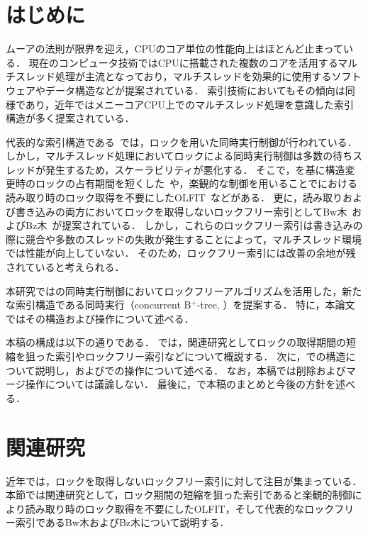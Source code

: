 
\section{はじめに}

ムーアの法則が限界を迎え，CPUのコア単位の性能向上はほとんど止まっている．
現在のコンピュータ技術ではCPUに搭載された複数のコアを活用するマルチスレッド処理が主流となっており，マルチスレッドを効果的に使用するソフトウェアやデータ構造などが提案されている．
索引技術においてもその傾向は同様であり，近年ではメニーコアCPU上でのマルチスレッド処理を意識した索引構造が多く提案されている．

代表的な索引構造である\Bptree{}~\cite{book:dbsystem}では，ロックを用いた同時実行制御が行われている．
しかし，マルチスレッド処理においてロックによる同時実行制御は多数の待ちスレッドが発生するため，スケーラビリティが悪化する．
そこで，\Bptree{}を基に構造変更時のロックの占有期間を短くした\Blinktree{}~\cite{tods1981:Lehman}や，楽観的な制御を用いることで\Blinktree{}における読み取り時のロック取得を不要にしたOLFIT~\cite{vldb2001:Cha}などがある．
更に，読み取りおよび書き込みの両方においてロックを取得しないロックフリー索引としてBw木~\cite{book:Bwtree}およびBz木~\cite{book:Bztree}が提案されている．
しかし，これらのロックフリー索引は書き込みの際に競合や多数のスレッドの失敗が発生することによって，マルチスレッド環境では性能が向上していない．
そのため，ロックフリー索引には改善の余地が残されていると考えられる．

本研究では\Bptree{}の同時実行制御においてロックフリーアルゴリズムを活用した，新たな索引構造である同時実行\Bptree{}（concurrent B$^{+}$-tree, \Bctree{}）を提案する．
特に，本論文ではその構造および操作について述べる．

本稿の構成は以下の通りである．
\Sec{\ref{sec:relatedwork}}では，関連研究としてロックの取得期間の短縮を狙った索引やロックフリー索引などについて概説する．
次に，\Sec{\ref{sec:bc_tree_structure}}で\Bctree{}の構造について説明し，\Sec{\ref{sec:node_operation}}および\Sec{\ref{sec:smo}}で\Bctree{}の操作について述べる．
なお，本稿では削除およびマージ操作については議論しない．
最後に，\Sec{\ref{sec:conclusion}}で本稿のまとめと今後の方針を述べる．

\section{関連研究}
\label{sec:relatedwork}

近年では，ロックを取得しないロックフリー索引に対して注目が集まっている．
本節では関連研究として，ロック期間の短縮を狙った索引である\Blinktree{}と楽観的制御により読み取り時のロック取得を不要にしたOLFIT，そして代表的なロックフリー索引であるBw木およびBz木について説明する．

